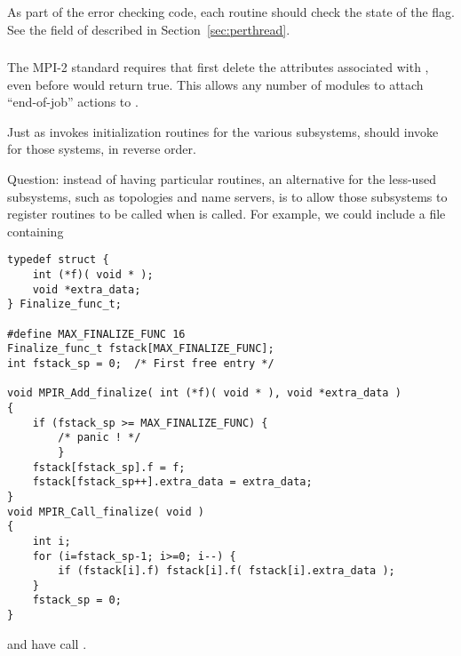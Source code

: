 \documentclass{article}
\begin{document}
\subsubsection{}
As part of the error checking code, each routine should check the
state of the  flag.  
See the  field of 
described in Section~\ref{sec:perthread}. 

\subsubsection{}
\label{sec:finalize}
The MPI-2 standard requires that  first delete the
attributes associated with , even before
 would return true.  This allows any number of
modules to attach ``end-of-job'' actions to .

Just as  invokes initialization routines for
the various subsystems,  should invoke
 for those systems, in reverse order.

Question: instead of having particular 
routines, an alternative for the less-used subsystems, such as
topologies and name servers, is to allow those subsystems to register
routines to be called when  is called.  For
example, we could include a file containing
\begin{verbatim}
typedef struct {
    int (*f)( void * );
    void *extra_data;
} Finalize_func_t;

#define MAX_FINALIZE_FUNC 16
Finalize_func_t fstack[MAX_FINALIZE_FUNC];
int fstack_sp = 0;  /* First free entry */

void MPIR_Add_finalize( int (*f)( void * ), void *extra_data )
{
    if (fstack_sp >= MAX_FINALIZE_FUNC) {
        /* panic ! */
        }
    fstack[fstack_sp].f = f;
    fstack[fstack_sp++].extra_data = extra_data;
}
void MPIR_Call_finalize( void )
{
    int i;
    for (i=fstack_sp-1; i>=0; i--) {
        if (fstack[i].f) fstack[i].f( fstack[i].extra_data );
    }
    fstack_sp = 0;
}
\end{verbatim}
and have  call .
\end{document}
